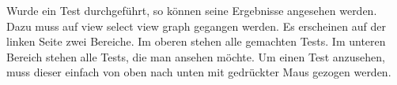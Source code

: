Wurde ein Test durchgeführt, so können seine Ergebnisse angesehen werden. Dazu muss auf view \textrightarrow select view \textrightarrow graph gegangen werden. Es erscheinen auf der linken Seite zwei Bereiche. Im oberen stehen alle gemachten Tests. Im unteren Bereich stehen alle Tests, die man ansehen möchte. Um einen Test anzusehen, muss dieser einfach von oben nach unten mit gedrückter Maus gezogen werden.

\begin{figure}[h]
    \centering
    \label{Tests auswählen}
\end{figure}